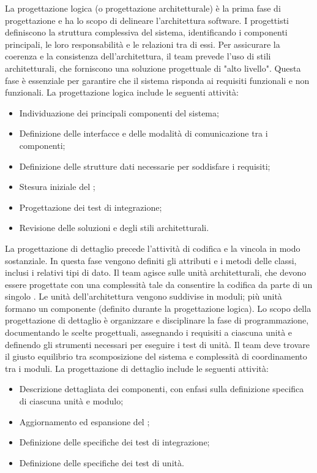 \label{progettazione-logica}
\par La progettazione logica (o progettazione architetturale) è la prima fase di progettazione e ha lo scopo di delineare l'architettura software. I progettisti definiscono la struttura complessiva del sistema, identificando i componenti principali, le loro responsabilità e le relazioni tra di essi. Per assicurare la coerenza e la consistenza dell'architettura, il team prevede l'uso di stili architetturali, che forniscono una soluzione progettuale di "alto livello". Questa fase è essenziale per garantire che il sistema risponda ai requisiti funzionali e non funzionali. La progettazione logica include le seguenti attività:
\begin{itemize}
  \item Individuazione dei principali componenti del sistema;
  \item Definizione delle interfacce e delle modalità di comunicazione tra i componenti;
  \item Definizione delle strutture dati necessarie per soddisfare i requisiti;
  \item Stesura iniziale del \MU;
  \item Progettazione dei test di integrazione;
  \item Revisione delle soluzioni e degli stili architetturali.
\end{itemize}

\label{progettazione-dettaglio}
\par La progettazione di dettaglio precede l'attività di codifica e la vincola in modo sostanziale. In questa fase vengono definiti gli attributi e i metodi delle classi, inclusi i relativi tipi di dato. Il team agisce sulle unità architetturali, che devono essere progettate con una complessità tale da consentire la codifica da parte di un singolo \Programmatore{}. Le unità dell’architettura vengono suddivise in moduli; più unità formano un componente (definito durante la progettazione logica). Lo scopo della progettazione di dettaglio è organizzare e disciplinare la fase di programmazione, documentando le scelte progettuali, assegnando i requisiti a ciascuna unità e definendo gli strumenti necessari per eseguire i test di unità. Il team deve trovare il giusto equilibrio tra scomposizione del sistema e complessità di coordinamento tra i moduli. La progettazione di dettaglio include le seguenti attività:
\begin{itemize}
  \item Descrizione dettagliata dei componenti, con enfasi sulla definizione specifica di ciascuna unità e modulo;
  \item Aggiornamento ed espansione del \MU;
  \item Definizione delle specifiche dei test di integrazione;
  \item Definizione delle specifiche dei test di unità.
\end{itemize}

